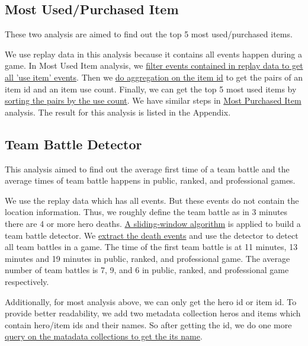 \documentclass{article}
\begin{document}
\subsection{Most Used/Purchased Item}

These two analysis are aimed to find out the top 5 most used/purchased items.

We use replay data in this analysis because it contains all events happen during a game. In Most Used Item analysis, we \href{https://github.com/Vopaaz/big-data-psg-lgd/blob/master/src/main/scala/MostUsedItem.scala#L38-L40}{filter events contained in replay data to get all 'use item' events}. Then we \href{https://github.com/Vopaaz/big-data-psg-lgd/blob/master/src/main/scala/MostUsedItem.scala#L41-L42}{do aggregation on the item id} to get the pairs of an item id and an item use count. Finally, we can get the top 5 most used items by \href{https://github.com/Vopaaz/big-data-psg-lgd/blob/master/src/main/scala/MostUsedItem.scala#L44}{sorting the pairs by the use count}. We have similar steps in \href{https://github.com/Vopaaz/big-data-psg-lgd/blob/master/src/main/scala/MostPurchasedItem.scala}{Most Purchased Item} analysis. The result for this analysis is listed in the Appendix.

\subsection{Team Battle Detector}

This analysis aimed to find out the average first time of a team battle and the average times of team battle happens in public, ranked, and professional games.

We use the replay data which has all events. But these events do not contain the location information. Thus, we roughly define the team battle as in 3 minutes there are 4 or more hero deaths. \href{https://github.com/Vopaaz/big-data-psg-lgd/blob/master/src/main/scala/TeamBattleDetector.scala#L61-L78}{A sliding-window algorithm} is applied to build a team battle detector. We \href{https://github.com/Vopaaz/big-data-psg-lgd/blob/master/src/main/scala/TeamBattleDetector.scala#L33-L36}{extract the death events} and use the detector to detect all team battles in a game. The time of the first team battle is at 11 minutes, 13 minutes and 19 minutes in public, ranked, and professional game. The average number of team battles is 7, 9, and 6 in public, ranked, and professional game respectively.

Additionally, for most analysis above, we can only get the hero id or item id. To provide better readability, we add two metadata collection heros and items which contain hero/item ids and their names. So after getting the id, we do one more \href{https://github.com/Vopaaz/big-data-psg-lgd/blob/master/src/main/scala/Spark/SparkMongoHelper.scala#L15-L29}{query on the matadata collections to get the its name}.
\end{document}
